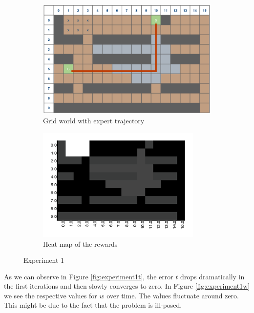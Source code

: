 \documentclass[10pt,a4paper,twocolumn]{article}
\begin{document}
\begin{figure}[h]
\begin{subfigure}[b]{0.5\textwidth}
	\includegraphics[width=\textwidth]{experiment_1_gridworld}
	\caption{Grid world with expert trajectory}
	\label{fig:experiment1trajectory}
\end{subfigure}
\begin{subfigure}[b]{0.5\textwidth}
	\includegraphics[width=\textwidth]{experiment_1_heatmap}
	\caption{Heat map of the rewards}
	\label{fig:experiment1heatmap}
\end{subfigure}
\caption{Experiment 1}
\end{figure}

\newpage

As we can observe in Figure \ref{fig:experiment1t}, the error $t$ drops dramatically in the first iterations and then slowly converges to zero. In Figure \ref{fig:experiment1w} we see the respective values for $w$ over time. The values fluctuate around zero. This might be due to the fact that the problem is ill-posed.
\end{document}
